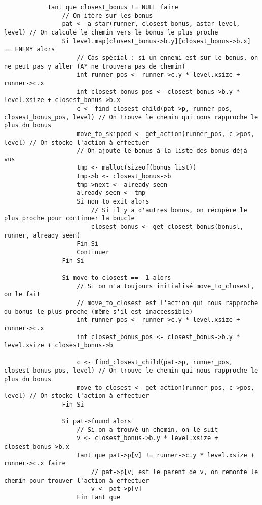 \begin{longlisting}
\begin{verbatim}
            Tant que closest_bonus != NULL faire
                // On itère sur les bonus
                pat <- a_star(runner, closest_bonus, astar_level, level) // On calcule le chemin vers le bonus le plus proche
                Si level.map[closest_bonus->b.y][closest_bonus->b.x] == ENEMY alors
                    // Cas spécial : si un ennemi est sur le bonus, on ne peut pas y aller (A* ne trouvera pas de chemin)
                    int runner_pos <- runner->c.y * level.xsize + runner->c.x
                    int closest_bonus_pos <- closest_bonus->b.y * level.xsize + closest_bonus->b.x
                    c <- find_closest_child(pat->p, runner_pos, closest_bonus_pos, level) // On trouve le chemin qui nous rapproche le plus du bonus
                    move_to_skipped <- get_action(runner_pos, c->pos, level) // On stocke l'action à effectuer
                    // On ajoute le bonus à la liste des bonus déjà vus
                    tmp <- malloc(sizeof(bonus_list))
                    tmp->b <- closest_bonus->b
                    tmp->next <- already_seen
                    already_seen <- tmp
                    Si non to_exit alors
                        // Si il y a d'autres bonus, on récupère le plus proche pour continuer la boucle
                        closest_bonus <- get_closest_bonus(bonusl, runner, already_seen)
                    Fin Si
                    Continuer
                Fin Si

                Si move_to_closest == -1 alors
                    // Si on n'a toujours initialisé move_to_closest, on le fait
                    // move_to_closest est l'action qui nous rapproche du bonus le plus proche (même s'il est inaccessible)
                    int runner_pos <- runner->c.y * level.xsize + runner->c.x
                    int closest_bonus_pos <- closest_bonus->b.y * level.xsize + closest_bonus->b

                    c <- find_closest_child(pat->p, runner_pos, closest_bonus_pos, level) // On trouve le chemin qui nous rapproche le plus du bonus
                    move_to_closest <- get_action(runner_pos, c->pos, level) // On stocke l'action à effectuer
                Fin Si

                Si pat->found alors
                    // Si on a trouvé un chemin, on le suit
                    v <- closest_bonus->b.y * level.xsize + closest_bonus->b.x
                    Tant que pat->p[v] != runner->c.y * level.xsize + runner->c.x faire
                        // pat->p[v] est le parent de v, on remonte le chemin pour trouver l'action à effectuer
                        v <- pat->p[v]
                    Fin Tant que


\end{verbatim}
\end{longlisting}
